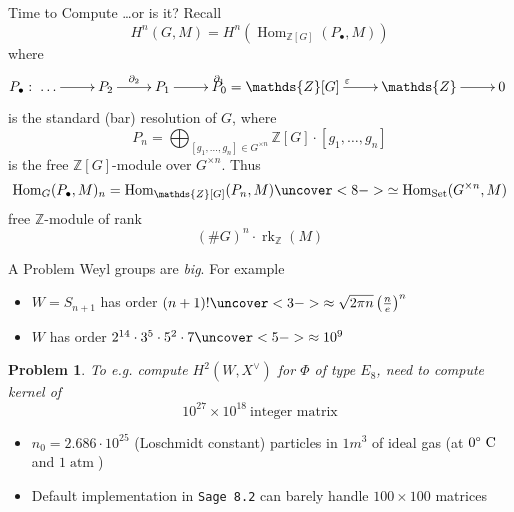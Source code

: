 \documentclass[pdf]{beamer}
\newcommand{\op}[1]{\operatorname{#1}}
\newcommand{\bbf}[1]{\mathds{#1}}
\newcommand{\Z}{\bbf{Z}}
\newtheorem*{problem*}{Problem}
\begin{document}
\begin{frame}{Time to Compute}
   \pause \dots or is it? \pause Recall\pause
   \[ H^n(G,M) = H^n(\op{Hom}_{\Z[G]}(P_\bullet{},M)) \]
   \pause where
   \[ P_\bullet{}: \xymatrix{\dots \ar[r] & P_2 \ar[r]^{\partial_2} & P_1 \ar[r]^{\partial_1} & P_0 = \Z[G] \ar[r]^\varepsilon & \Z \ar[r] & 0 } \]
   is the standard (bar) resolution of $G$\pause , where
   \[ P_n = \bigoplus_{[g_1,\dots,g_n] \in G^{\times n}} \Z[G]\cdot{}[g_1,\dots,g_n] \]
   is the free $\Z[G]$-module over $G^{\times n}$. \pause Thus 
   \[ \op{Hom}_G(P_\bullet{},M)_n = \op{Hom}_{\Z[G]}(P_n,M) \uncover<8->{\simeq \op{Hom}_{\op{Set}}(G^{\times n}, M)} \]
   \pause[9] free $\Z$-module \pause of rank
   \[ (\# G)^n \cdot{} \op{rk}_\Z(M) \]
\end{frame}

\begin{frame}{A Problem}
   Weyl groups are \textit{big}. \pause For example
   \begin{itemize}
      \item<2->[$A_n$:] $W = S_{n+1}$ has order $(n+1)! \uncover<3->{\approx \sqrt{2\pi n}\left(\frac{n}{e}\right)^n}$
      \item<4->[$E_8$:] $W$ has order $2^{14}\cdot{}3^5\cdot{}5^2\cdot 7 \uncover<5->{ \approx 10^9}$
   \end{itemize}
   \pause[6] \begin{problem*}To e.g. compute $H^2(W,X^\vee)$ for $\Phi$ of type $E_8$, need to compute kernel of
   \[ 10^{27} \times 10^{18}\ \text{integer matrix} \]
   \end{problem*}
   \begin{itemize}
      \item<7-> $n_0 = 2.686 \cdot 10^{25}$ (Loschmidt constant) particles in $1 m^3$ of ideal gas (at $0 \text{\textdegree\ C}$ and $1 \op{atm}$)
      \item<8-> Default implementation in \texttt{Sage 8.2} can barely handle $100 \times 100$ matrices
   \end{itemize}
\end{frame}
\end{document}
